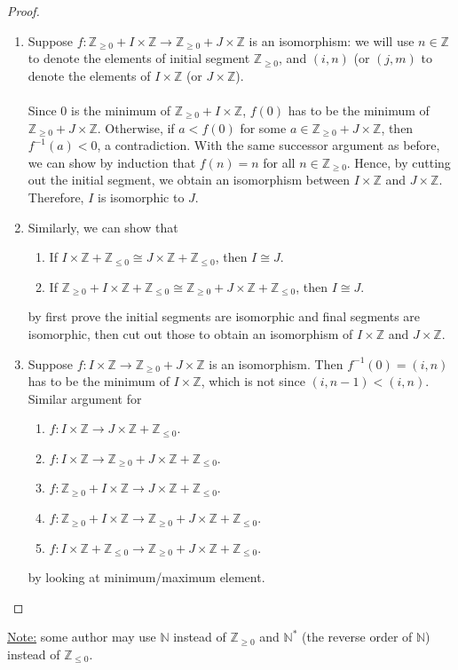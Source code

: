 \documentclass{treatise}
\begin{document}
\begin{proof}
\begin{enumerate}
    \item Suppose $f: \mathbb{Z}_{\geq 0} + I \times \mathbb{Z} \to \mathbb{Z}_{\geq 0} + J \times \mathbb{Z}$ is an isomorphism: we will use $n \in \mathbb{Z}$ to denote the elements of initial segment $\mathbb{Z}_{\geq 0}$, and $(i, n)$ (or $(j, m)$ to denote the elements of $I \times \mathbb{Z}$ (or $J \times \mathbb{Z}$).
    \\
    \\
    Since $0$ is the minimum of $\mathbb{Z}_{\geq 0} + I \times \mathbb{Z}$, $f(0)$ has to be the minimum of $\mathbb{Z}_{\geq 0} + J \times \mathbb{Z}$. Otherwise, if $a < f(0)$ for some $a \in \mathbb{Z}_{\geq 0} + J \times \mathbb{Z}$, then $f^{-1}(a) < 0$, a contradiction. With the same successor argument as before, we can show by induction that $f(n) = n$ for all $n \in \mathbb{Z}_{\geq 0}$. Hence, by cutting out the initial segment, we obtain an isomorphism between $I \times \mathbb{Z}$ and $J \times \mathbb{Z}$. Therefore, $I$ is isomorphic to $J$.
    \item Similarly, we can show that
    \begin{enumerate}
        \item If $I \times \mathbb{Z} + \mathbb{Z}_{\leq 0} \cong J \times \mathbb{Z} + \mathbb{Z}_{\leq 0}$, then $I \cong J$.
        \item If $\mathbb{Z}_{\geq 0} + I \times \mathbb{Z} + \mathbb{Z}_{\leq 0} \cong \mathbb{Z}_{\geq 0} + J \times \mathbb{Z} + \mathbb{Z}_{\leq 0}$, then $I \cong J$.
    \end{enumerate}
     by first prove the initial segments are isomorphic and final segments are isomorphic, then cut out those to obtain an isomorphism of $I \times \mathbb{Z}$ and $J \times \mathbb{Z}$.
    \item Suppose $f: I \times \mathbb{Z} \to \mathbb{Z}_{\geq 0} + J \times \mathbb{Z}$ is an isomorphism. Then $f^{-1}(0) = (i, n)$ has to be the minimum of $I \times \mathbb{Z}$, which is not since $(i, n - 1) < (i, n)$. Similar argument for
    \begin{enumerate}
        \item $f: I \times \mathbb{Z} \to J \times \mathbb{Z} + \mathbb{Z}_{\leq 0}$.
        \item $f: I \times \mathbb{Z} \to \mathbb{Z}_{\geq 0} + J \times \mathbb{Z} + \mathbb{Z}_{\leq 0}$.
        \item $f: \mathbb{Z}_{\geq 0} + I \times \mathbb{Z} \to J \times \mathbb{Z} + \mathbb{Z}_{\leq 0}$.
        \item $f: \mathbb{Z}_{\geq 0} + I \times \mathbb{Z} \to \mathbb{Z}_{\geq 0} + J \times \mathbb{Z} + \mathbb{Z}_{\leq 0}$.
        \item $f:I \times \mathbb{Z} + \mathbb{Z}_{\leq 0} \to \mathbb{Z}_{\geq 0} + J \times \mathbb{Z} + \mathbb{Z}_{\leq 0}$.
    \end{enumerate}
    by looking at minimum/maximum element.
\end{enumerate}
\end{proof}
\underline{Note:} some author may use $\mathbb{N}$ instead of $\mathbb{Z}_{\geq 0}$ and $\mathbb{N}^*$ (the reverse order of $\mathbb{N}$) instead of $\mathbb{Z}_{\leq 0}$.
\end{document}
